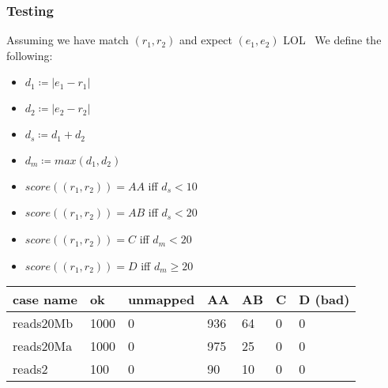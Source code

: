 

\begin{frame}
  \frametitle{Testing}

  Assuming we have match $(r_1, r_2)$ and expect $(e_1, e_2)$
  LOL~\nocite{wombat2016}
  We define the following:

  \begin{itemize}
    \item $d_1 \coloneqq |e_1 - r_1|$
    \item $d_2 \coloneqq |e_2 - r_2|$
    \item $d_s \coloneqq d_1 + d_2$
    \item $d_m \coloneqq max(d_1, d_2)$
  \end{itemize}

  \begin{itemize}
    \item $score((r_1, r_2)) = AA$ iff $d_s < 10$
    \item $score((r_1, r_2)) = AB$ iff $d_s < 20$
    \item $score((r_1, r_2)) = C$ iff $d_m < 20$
    \item $score((r_1, r_2)) = D$ iff $d_m \geq 20$
  \end{itemize}

  
  \begin{table}[]
    \begin{tabular}{|l|l|l|l|l|l|l|}
    \hline
    case name                        & ok                          & unmapped                 & AA                         & AB                        & C                        & D (bad)                  \\ \hline
    \rowcolor[HTML]{333333} 
    {\color[HTML]{FFFFFF} reads20Mb} & {\color[HTML]{FFFFFF} 1000} & {\color[HTML]{FFFFFF} 0} & {\color[HTML]{FFFFFF} 936} & {\color[HTML]{FFFFFF} 64} & {\color[HTML]{FFFFFF} 0} & {\color[HTML]{FFFFFF} 0} \\ \hline
    \rowcolor[HTML]{FFFFFF} 
    {\color[HTML]{333333} reads20Ma} & {\color[HTML]{333333} 1000} & {\color[HTML]{333333} 0} & {\color[HTML]{333333} 975} & {\color[HTML]{333333} 25} & {\color[HTML]{333333} 0} & {\color[HTML]{333333} 0} \\ \hline
    \rowcolor[HTML]{333333} 
    {\color[HTML]{DAE8FC} reads2}    & {\color[HTML]{DAE8FC} 100}  & {\color[HTML]{DAE8FC} 0} & {\color[HTML]{DAE8FC} 90}  & {\color[HTML]{DAE8FC} 10} & {\color[HTML]{DAE8FC} 0} & {\color[HTML]{DAE8FC} 0} \\ \hline
    \end{tabular}
  
  \end{table}

\end{frame}

